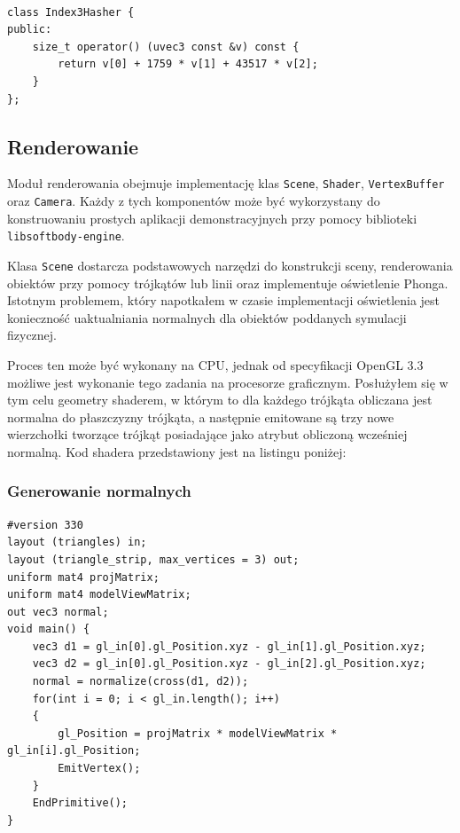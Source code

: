 {\begin{lstlisting}[caption=Funkcja haszujące, label=hashfunc]

class Index3Hasher {
public:
	size_t operator() (uvec3 const &v) const {
		return v[0] + 1759 * v[1] + 43517 * v[2];
	}
};
\end{lstlisting}

\subsection{Renderowanie}
Moduł renderowania obejmuje implementację klas \texttt{Scene}, \texttt{Shader},
\texttt{VertexBuffer} oraz \texttt{Camera}. Każdy z tych komponentów może
być wykorzystany do konstruowaniu prostych aplikacji demonstracyjnych przy pomocy
biblioteki \texttt{libsoftbody-engine}. 

Klasa \texttt{Scene} dostarcza podstawowych narzędzi do konstrukcji sceny,
renderowania obiektów przy pomocy trójkątów lub linii oraz implementuje
oświetlenie Phonga. Istotnym problemem, który napotkałem w czasie
implementacji oświetlenia jest konieczność uaktualniania normalnych dla obiektów
poddanych symulacji fizycznej.

Proces ten może być wykonany na CPU, jednak od specyfikacji OpenGL 3.3 możliwe
jest wykonanie tego zadania na procesorze graficznym. Posłużyłem się w tym celu
geometry shaderem, w którym to dla każdego trójkąta obliczana jest normalna do
płaszczyzny trójkąta, a następnie emitowane są trzy nowe
wierzchołki tworzące trójkąt posiadające jako atrybut obliczoną wcześniej
normalną. Kod shadera przedstawiony jest na listingu poniżej:

\subsubsection{Generowanie normalnych}
\begin{lstlisting}[caption=Generacja normalnych w geometry shaderze,
	label=normalne]
#version 330
layout (triangles) in;
layout (triangle_strip, max_vertices = 3) out;
uniform mat4 projMatrix;
uniform mat4 modelViewMatrix;
out vec3 normal;
void main() {
	vec3 d1 = gl_in[0].gl_Position.xyz - gl_in[1].gl_Position.xyz;
	vec3 d2 = gl_in[0].gl_Position.xyz - gl_in[2].gl_Position.xyz;
	normal = normalize(cross(d1, d2));
	for(int i = 0; i < gl_in.length(); i++)
	{
		gl_Position = projMatrix * modelViewMatrix * gl_in[i].gl_Position;
		EmitVertex();
	}
	EndPrimitive();
}
\end{lstlisting}

}
